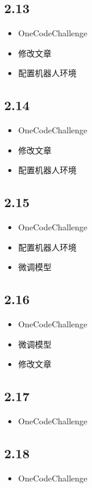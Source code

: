 \documentclass[UTF8]{ctexart}
\begin{document}
\subsection*{2.13}
\begin{itemize}
    \item OneCodeChallenge
    \item 修改文章
    \item 配置机器人环境
\end{itemize}

\subsection*{2.14}
\begin{itemize}
    \item OneCodeChallenge
    \item 修改文章
    \item 配置机器人环境
\end{itemize}

\subsection*{2.15}
\begin{itemize}
    \item OneCodeChallenge
    \item 配置机器人环境
    \item 微调模型
\end{itemize}

\subsection*{2.16}
\begin{itemize}
    \item OneCodeChallenge
    \item 微调模型
    \item 修改文章
\end{itemize}

\subsection*{2.17}
\begin{itemize}
    \item OneCodeChallenge
\end{itemize}

\subsection*{2.18}
\begin{itemize}
    \item OneCodeChallenge
\end{itemize}
\end{document}
